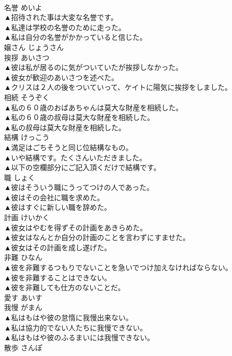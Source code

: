 \documentclass[8pt]{extreport}
\begin{document}
\begin{CJK}{UTF8}{min}
\\	名誉	めいよ	
\\	▲招待された事は大変な名誉です。 
\\	▲私達は学校の名誉のために走った。 
\\	▲私は自分の名誉がかかっていると信じた。 
\\	嬢さん	じょうさん	
\\	挨拶	あいさつ	
\\	▲彼は私が居るのに気がついていたが挨拶しなかった。 
\\	▲彼女が歓迎のあいさつを述べた。 
\\	▲クリスは２人の後をついていって、ケイトに陽気に挨拶をしました。 
\\	相続	そうぞく	
\\	▲私の６０歳のおばあちゃんは莫大な財産を相続した。 
\\	▲私の６０歳の叔母は莫大な財産を相続した。 
\\	▲私の叔母は莫大な財産を相続した。 
\\	結構	けっこう	
\\	▲満足はごちそうと同じ位結構なもの。 
\\	▲いや結構です。たくさんいただきました。 
\\	▲以下の空欄部分にご記入頂くだけで結構です。 
\\	職	しょく	
\\	▲彼はそういう職にうってつけの人であった。 
\\	▲彼はその会社に職を求めた。 
\\	▲彼はすぐに新しい職を辞めた。 
\\	計画	けいかく	
\\	▲彼女はやむを得ずその計画をあきらめた。 
\\	▲彼女はなんとか自分の計画のことを言わずにすませた。 
\\	▲彼女はその計画を成し遂げた。 
\\	非難	ひなん	
\\	▲彼を非難するつもりでないことを急いでつけ加えなければならない。 
\\	▲彼を非難することはできない。 
\\	▲彼を非難しても仕方のないことだ。 
\\	愛す	あいす	
\\	我慢	がまん	
\\	▲私はもはや彼の怠惰に我慢出来ない。 
\\	▲私は協力的でない人たちに我慢できない。 
\\	▲私はもはや彼のふるまいには我慢できない。 
\\	散歩	さんぽ	

\end{CJK}
\end{document}

